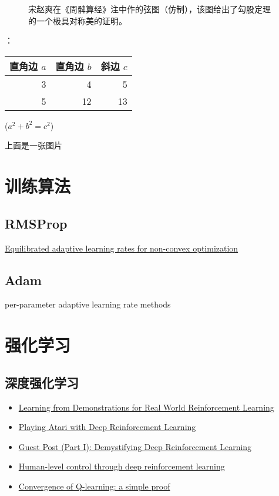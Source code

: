 \documentclass[10pt,a4paper]{ctexbook}
\begin{document}
\begin{figure}[ht]
\centering
\caption{宋赵爽在《周髀算经》注中作的弦图（仿制），该图给出了勾股定理的一个极具对称美的证明。} 
\label{fig:cnn}
\end{figure}：

\begin{table}[H]
\begin{tabular}{|rrr|}
\hline
直角边 $a$ & 直角边 $b$ & 斜边 $c$\\
\hline
3 & 4 & 5 \\
5 & 12 & 13 \\
\hline
\end{tabular}%
\qquad
($a^2 + b^2 = c^2$)
\end{table}

上面是一张图片

\section{训练算法}

\subsection{RMSProp}
\href{https://arxiv.org/abs/1502.04390}{Equilibrated adaptive learning rates for non-convex optimization}

\subsection{Adam}
per-parameter adaptive learning rate methods


\section{强化学习}

\subsection{深度强化学习}
\begin{itemize}
\item \href{https://arxiv.org/pdf/1704.03732.pdf}{Learning from Demonstrations for Real World Reinforcement Learning}
\item \href{https://arxiv.org/abs/1312.5602}{Playing Atari with Deep Reinforcement Learning}
\item \href{https://www.intelnervana.com/demystifying-deep-reinforcement-learning/}{Guest Post (Part I): Demystifying Deep Reinforcement Learning}
\item \href{https://storage.googleapis.com/deepmind-media/dqn/DQNNaturePaper.pdf}{Human-level control through deep reinforcement learning}
\item \href{http://simplecore-dev.intel.com/nervana/wp-content/uploads/sites/55/2015/12/ProofQlearning.pdf}{Convergence of Q-learning: a simple proof}
\end{itemize}
\end{document}
